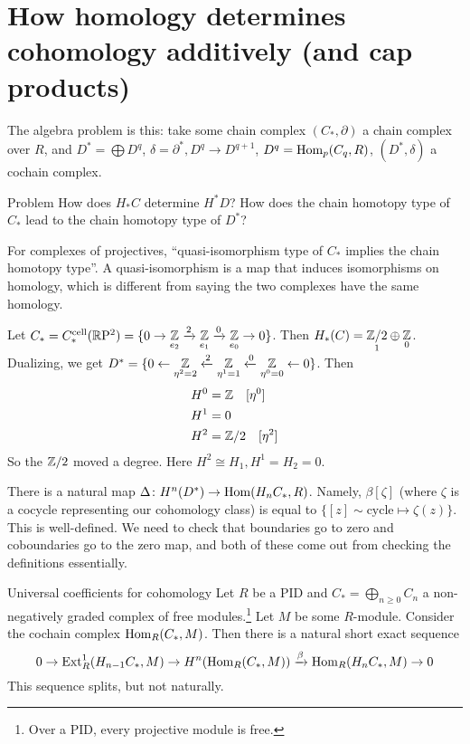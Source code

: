 \section{How homology determines cohomology additively (and cap products)} 
The algebra problem is this: take some chain complex $\left( C_*, \partial  \right) $ a chain complex over $R$, and $D^*=\bigoplus D^q$, $\delta=\partial ^*, D^q \to  D^{q+1}$, $D^q=\operatorname{Hom}_p(C_q,R)$,  $(D^*,\delta)$ a cochain complex.
\begin{namedthing}{Problem} 
   How does $H_* C$ determine $H^* D$? How does the chain homotopy type of $C_*$ lead to the chain homotopy type of $D^*$?
\end{namedthing}
For complexes of projectives, ``quasi-isomorphism type of $C_*$ implies the chain homotopy type''. A quasi-isomorphism is a map that induces isomorphisms on homology, which is different from saying the two complexes have the same homology.
\begin{example}
    Let $C_*= C_* ^{\mathrm{cell}}(\mathbb{R} \mathrm P^2)= \{0 \to \underset{e_2}{\mathbb{Z}}  \xrightarrow 2 \underset{e_1}{\mathbb{Z}} \xrightarrow 0 \underset{e_0}{\mathbb{Z}} \to 0\} $. Then $H_*(C)= \underset{1}{\mathbb{Z}/2}  \oplus \underset{0}{\mathbb{Z}} $. Dualizing, we get $D^*=\{0 \leftarrow \underset{\eta ^2=2}{\mathbb{Z}}\xleftarrow 2 \underset{\eta^1=1}{\mathbb{Z}} \xleftarrow 0 \underset{\eta^0=0}{\mathbb{Z}} \leftarrow 0  \} $. Then 
    \begin{align*}
        &H^0 =\mathbb{Z} \quad[\eta^0]\\
        &H^1=0\\
        &H^2= \mathbb{Z} / 2\quad [\eta^2]
    \end{align*}So the $\mathbb{Z} /2$ moved a degree. Here $H^2 \cong H_1, H^1=H_2=0$. 
\end{example}
There is a natural map $\Delta  \colon H^n (D^*)  \to \operatorname{Hom}(H_n C_*, R)$. Namely, $\beta [\zeta]$ (where $\zeta$ is a cocycle representing our cohomology class) is equal to $\{[z]\sim \text{cycle} \mapsto \zeta(z)\} $. This is well-defined. We need to check that boundaries go to zero and coboundaries go to the zero map, and both of these come out from checking the definitions essentially.
\begin{namedthm}{Universal coefficients for cohomology} 
    Let $R$ be a PID and $C_*=\bigoplus _{n \geq 0}C_n $ a non-negatively graded complex of free modules.\footnote{Over a PID, every projective module is free.} Let $M$ be some $R$-module. Consider the cochain complex $\operatorname{Hom}_R(C_* ,M)$. Then there is a natural short exact sequence  \[
        0 \to \mathrm{Ext}^1_R(H_{n-1}C_*,M) \to H^n (\operatorname{Hom} _R(C_*,M))\xrightarrow{\beta } \operatorname{Hom}_R(H_n C_*,M) \to 0
    \] This sequence splits, but not naturally.
\end{namedthm}

